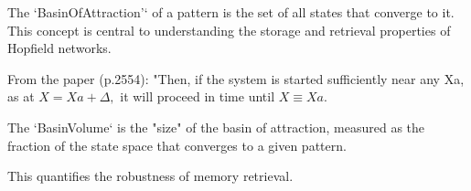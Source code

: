 \begin{definition}\label{BasinOfAttraction'}
\leanok
The `BasinOfAttraction'` of a pattern is the set of all states that converge to it.
This concept is central to understanding the storage and retrieval properties of Hopfield networks.

From the paper (p.2554): "Then, if the system is started sufficiently near any Xa,
as at $X = Xa + \Delta,$ it will proceed in time until $X \equiv Xa.$
\end{definition}

\begin{definition}\label{BasinVolume}
\leanok
The `BasinVolume` is the "size" of the basin of attraction, measured as the
fraction of the state space that converges to a given pattern.

This quantifies the robustness of memory retrieval.
\end{definition}

